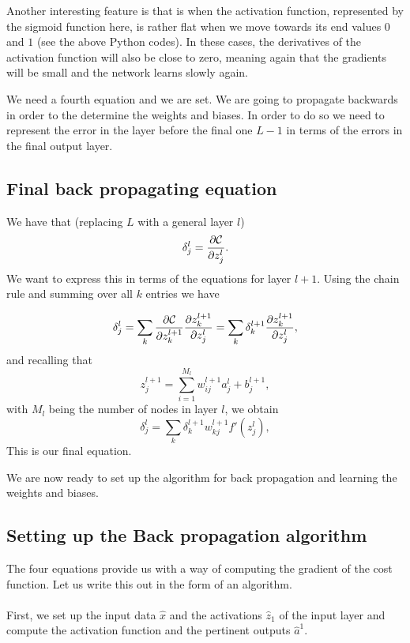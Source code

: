 \documentclass[%
oneside,                 %
final,                   %
10pt]{article}
\begin{document}
Another interesting feature is that is when the activation function,
represented by the sigmoid function here, is rather flat when we move towards
its end values $0$ and $1$ (see the above Python codes). In these
cases, the derivatives of the activation function will also be close
to zero, meaning again that the gradients will be small and the
network learns slowly again.



We need a fourth equation and we are set. We are going to propagate
backwards in order to the determine the weights and biases. In order
to do so we need to represent the error in the layer before the final
one $L-1$ in terms of the errors in the final output layer.

\subsection*{Final back propagating equation}

We have that (replacing $L$ with a general layer $l$)
\[
\delta_j^l =\frac{\partial {\cal C}}{\partial z_j^l}.
\]
We want to express this in terms of the equations for layer $l+1$. Using the chain rule and summing over all $k$ entries we have

\[
\delta_j^l =\sum_k \frac{\partial {\cal C}}{\partial z_k^{l+1}}\frac{\partial z_k^{l+1}}{\partial z_j^{l}}=\sum_k \delta_k^{l+1}\frac{\partial z_k^{l+1}}{\partial z_j^{l}},
\]
and recalling that
\[
z_j^{l+1} = \sum_{i=1}^{M_{l}}w_{ij}^{l+1}a_j^{l}+b_j^{l+1},
\]
with $M_l$ being the number of nodes in layer $l$, we obtain
\[
\delta_j^l =\sum_k \delta_k^{l+1}w_{kj}^{l+1}f'(z_j^l),
\]
This is our final equation.

We are now ready to set up the algorithm for back propagation and learning the weights and biases.

\subsection*{Setting up the Back propagation algorithm}



The four equations  provide us with a way of computing the gradient of the cost function. Let us write this out in the form of an algorithm.


\paragraph{}
First, we set up the input data $\hat{x}$ and the activations
$\hat{z}_1$ of the input layer and compute the activation function and
the pertinent outputs $\hat{a}^1$.
\end{document}
